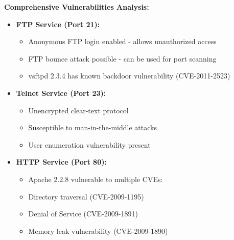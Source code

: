 \documentclass[12pt]{article}
\begin{document}
\textbf{Comprehensive Vulnerabilities Analysis:}
\begin{itemize}
  \item \textbf{FTP Service (Port 21):}
    \begin{itemize}
      \item Anonymous FTP login enabled - allows unauthorized access
      \item FTP bounce attack possible - can be used for port scanning
      \item vsftpd 2.3.4 has known backdoor vulnerability (CVE-2011-2523)
    \end{itemize}
  \item \textbf{Telnet Service (Port 23):}
    \begin{itemize}
      \item Unencrypted clear-text protocol
      \item Susceptible to man-in-the-middle attacks
      \item User enumeration vulnerability present
    \end{itemize}
  \item \textbf{HTTP Service (Port 80):}
    \begin{itemize}
      \item Apache 2.2.8 vulnerable to multiple CVEs:
      \item Directory traversal (CVE-2009-1195)
      \item Denial of Service (CVE-2009-1891)
      \item Memory leak vulnerability (CVE-2009-1890)
    \end{itemize}
\end{itemize}
\end{document}

